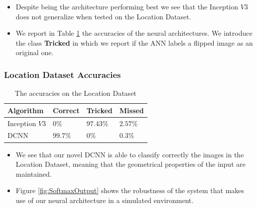 \documentclass[a0, portrait]{IWIposter}
\begin{document}
\begin{multicols}{3}
\begin{itemize}
	\item Despite being the architecture performing best we see that the Inception $V3$ does not generalize when tested on the Location Dataset.
	\item We report in Table \ref{tab:tab2} the accuracies of the neural architectures. We introduce the class \textbf{Tricked} in which we report if the ANN labels a flipped image as an original one.
\end{itemize}

\centering
\subsubsection*{Location Dataset Accuracies}

\begin{table}
\centering
\caption{The accuracies on the Location Dataset}
\begin{tabular}{>{\rowmac}l|>{\rowmac}l|>{\rowmac}l|>{\rowmac}l<{\clearrow}}
\textbf{Algorithm}   & \textbf{Correct} & \textbf{Tricked} & \textbf{Missed}  \\ \hline
       Inception $V3$         & $0\%$              & $97.43\%$            & $2.57\%$     \\
       DCNN                   & $99.7\%$              & $0\%$           & $0.3\%$          \\
\end{tabular}\label{tab:tab2}
\end{table}

\begin{itemize}
	\item We see that our novel DCNN is able to classify correctly the images in the Location Dataset, meaning that the geometrical properties of the input are maintained. 
	\item Figure \ref{fig:SoftmaxOutput} shows the robustness of the system that makes use of our neural architecture in a simulated environment. 
\end{itemize}



\end{multicols}
\end{document}
